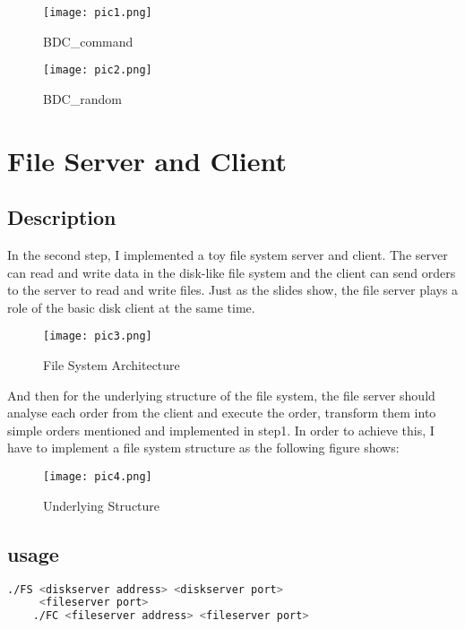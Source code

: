 \documentclass[a4paper]{article}
\begin{document}
\begin{figure}[h!]
    \begin{minipage}[t]{0.36\textwidth}
        \centering
        \texttt{[image: pic1.png]}
        \caption{BDC\_command}
    \end{minipage}
    \begin{minipage}[t]{0.64\textwidth}
        \centering
        \texttt{[image: pic2.png]}
        \caption{BDC\_random}
    \end{minipage}
    
\end{figure}
    
\section{File Server and Client}
\subsection{Description}
In the second step, I implemented a toy file system server and client. The server can read and write data in the disk-like file system and the client can send orders to the server to read and write files.
Just as the slides show, the file server plays a role of the basic disk client at the same time.

\begin{figure}[h]
    \centering
    \texttt{[image: pic3.png]}
    \caption{File System Architecture}
\end{figure}

And then for the underlying structure of the file system, the file server should analyse each order from the client and execute the order, transform them into simple orders mentioned and implemented in step1. In order to achieve this, I have to implement a file system structure as the following figure shows:

\begin{figure}[h]
    \centering
    \texttt{[image: pic4.png]}
    \caption{Underlying Structure}
\end{figure}

\subsection{usage}
\begin{lstlisting}[language=bash]
    ./FS <diskserver address> <diskserver port>
     <fileserver port>
    ./FC <fileserver address> <fileserver port>
\end{lstlisting}
\end{document}
